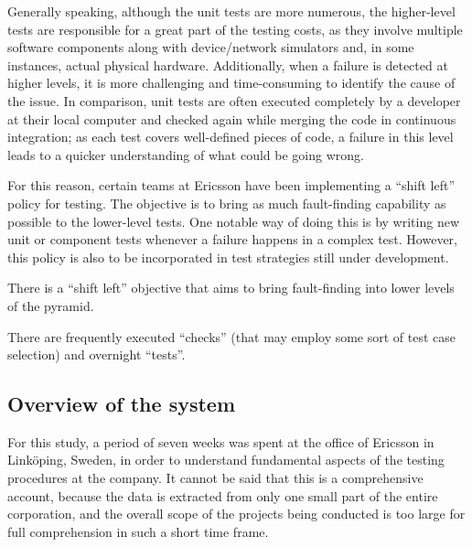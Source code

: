 Generally speaking, although the unit tests are more numerous, the higher-level tests are responsible for a great part of the testing costs, as they involve multiple software components along with device/network simulators and, in some instances, actual physical hardware.
Additionally, when a failure is detected at higher levels, it is more challenging and time-consuming to identify the cause of the issue.
In comparison, unit tests are often executed completely by a developer at their local computer and checked again while merging the code in continuous integration; as each test covers well-defined pieces of code, a failure in this level leads to a quicker understanding of what could be going wrong.

For this reason, certain teams at Ericsson have been implementing a ``shift left'' policy for testing.
The objective is to bring as much fault-finding capability as possible to the lower-level tests.
One notable way of doing this is by writing new unit or component tests whenever a failure happens in a complex test.
However, this policy is also to be incorporated in test strategies still under development.



%


There is a ``shift left'' objective that aims to bring fault-finding into lower levels of the pyramid.

There are frequently executed ``checks'' (that may employ some sort of test case selection) and overnight ``tests''.


\subsection{Overview of the system}

For this study, a period of seven weeks was spent at the office of Ericsson in Linköping, Sweden, in order to understand fundamental aspects of the testing procedures at the company.
It cannot be said that this is a comprehensive account, because the data is extracted from only one small part of the entire corporation, and the overall scope of the projects being conducted is too large for full comprehension in such a short time frame.

